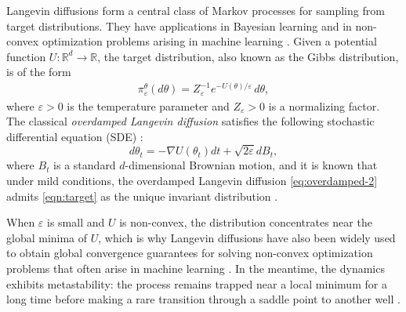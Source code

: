\documentclass[11pt]{article}
\numberwithin{equation}{section}
\theoremstyle{plain}
\theoremstyle{definition}
\theoremstyle{remark}
\newcommand{\R}{\mathbb R}
\newcommand{\eps}{\varepsilon}
\begin{document}
Langevin diffusions form a central class of Markov processes for sampling from
target distributions.  They have applications in
Bayesian learning
\cite{gelman1995bayesian,stuart2010inverse,andrieu2003introduction,teh2016consistency,DistMCMC19,GIWZ2024}
and in non-convex optimization problems arising in machine learning
\cite{Raginsky,xu2018global,Chau2019,GGZ,Chau2022,Zhang2019}.
Given a potential function $U:\R^d\to\R$, the target distribution, also known as the Gibbs distribution, is of the form
\begin{align}\label{eqn:target}
\pi_\eps^\theta(d\theta)
=
Z_{\eps}^{-1} e^{-U(\theta)/\eps}\,d\theta ,
\end{align}
where $\eps>0$ is the temperature parameter and $Z_{\eps}>0$ is a normalizing factor.
The classical \textit{overdamped Langevin diffusion} satisfies the following stochastic differential equation (SDE) \cite{Dalalyan,DM2017,DK2017,Raginsky}:
\begin{equation}\label{eq:overdamped-2}
d\theta_{t}=-\nabla U(\theta_{t})dt+\sqrt{2\varepsilon}dB_{t},
\end{equation}
where $B_{t}$ is a standard $d$-dimensional Brownian motion,
and it is known that under mild conditions,
the overdamped Langevin diffusion \eqref{eq:overdamped-2} admits
\eqref{eqn:target} as the unique invariant distribution \cite{chiang1987diffusion,stroock-langevin-spectrum}.

When $\eps$ is small and $U$ is non-convex, the distribution concentrates near the global minima of $U$,
which is why Langevin diffusions have also been widely used
to obtain global convergence guarantees for solving non-convex optimization problems that often arise in machine learning \cite{Raginsky,xu2018global,Chau2019,Zhang2019}.
In the meantime, the dynamics exhibits metastability: the process remains trapped near a local minimum for a long time before making a rare transition through a saddle point to another well \cite{BovierDenHollander2015}.
\end{document}
